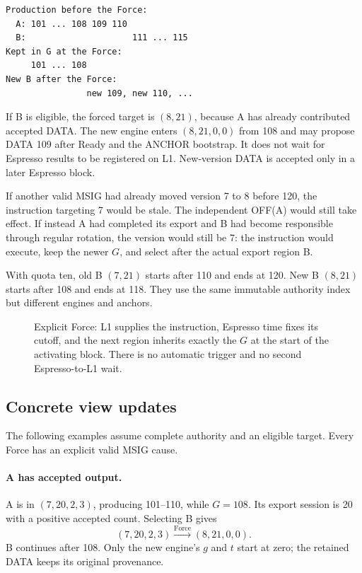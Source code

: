 \documentclass[11pt,a4paper]{article}
\begin{document}
\begin{center}\small
\begin{verbatim}
Production before the Force:
  A: 101 ... 108 109 110
  B:                     111 ... 115
Kept in G at the Force:
     101 ... 108
New B after the Force:
                new 109, new 110, ...
\end{verbatim}
\end{center}

If B is eligible, the forced target is $(8,21)$, because A has already
contributed accepted DATA. The new engine enters $(8,21,0,0)$ from 108 and
may propose DATA 109 after Ready and the ANCHOR bootstrap. It does not
wait for Espresso results to be registered on L1. New-version DATA is
accepted only in a later Espresso block.

If another valid MSIG had already moved version 7 to 8 before 120, the
instruction targeting 7 would be stale. The independent OFF(A) would still
take effect. If instead A had completed its export and B had become
responsible through regular rotation, the version would still be 7: the
instruction would execute, keep the newer $G$, and select after the
actual export region B.

With quota ten, old B $(7,21)$ starts after 110 and ends at 120. New B
$(8,21)$ starts after 108 and ends at 118. They use the same immutable
authority index but different engines and anchors.

\begin{figure}[p]\centering

\caption{Explicit Force: L1 supplies the instruction, Espresso time fixes
its cutoff, and the next region inherits exactly the $G$ at the start of
the activating block. There is no automatic trigger and no second
Espresso-to-L1 wait.}
\label{fig:forced-cross-region}
\end{figure}
\FloatBarrier

\subsection{Concrete view updates}
\label{sec:force-view-examples}
The following examples assume complete authority and an eligible target.
Every Force has an explicit valid MSIG cause.

\paragraph{A has accepted output.}
A is in $(7,20,2,3)$, producing 101--110, while $G=108$. Its export
session is 20 with a positive accepted count. Selecting B gives
\[
 (7,20,2,3)\xrightarrow{\mathrm{Force}}(8,21,0,0).
\]
B continues after 108. Only the new engine's $g$ and $t$ start at zero;
the retained DATA keeps its original provenance.
\end{document}
